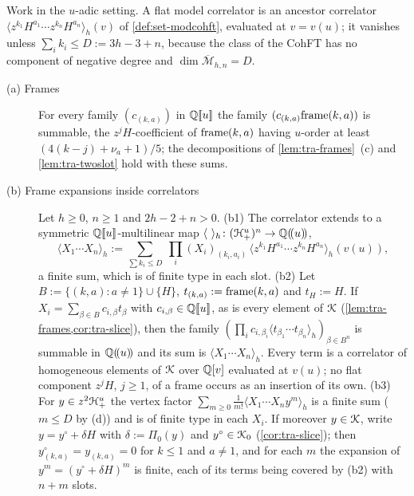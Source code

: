 
\begin{lem}
\label{lem:tra-conv}
Work in the $u$-adic setting. A flat model correlator is an ancestor correlator $\langle z^{k_1}H^{a_1}\cdots z^{k_n}H^{a_n}\rangle_h(v)$ of \cref{def:set-modcohft}, evaluated at $v = v(u)$; it vanishes unless $\sum_ik_i\leq D := 3h-3+n$, because the class of the CohFT has no component of negative degree and $\dim\overline{\mathcal M}_{h,n} = D$.
\begin{description}
\item[(a) Frames] For every family $(c_{(k,a)})$ in $\mathbb{Q}[\![ u ]\!]$ the family $(c_{(k,a)}\mathrm{frame}(k,a))$ is summable, the $z^jH$-coefficient of $\mathrm{frame}(k,a)$ having $u$-order at least $(4(k-j)+\nu_a+1)/5$; the decompositions of \cref{lem:tra-frames}~(c) and \cref{lem:tra-twoslot} hold with these sums.
\item[(b) Frame expansions inside correlators] Let $h\geq 0$, $n\geq 1$ and $2h-2+n>0$.
(b1) The correlator extends to a symmetric $\mathbb{Q}[\![ u ]\!]$-multilinear map $\langle\ \rangle_h\colon(\cH^u_+)^n\to\bbQ\lser{u}$,
\[
\langle X_1\cdots X_n\rangle_h := \sum_{\sum k_i\leq D}\ \prod_i(X_i)_{(k_i,a_i)}\,\langle z^{k_1}H^{a_1}\cdots z^{k_n}H^{a_n}\rangle_h(v(u)),
\]
a finite sum, which is of finite type in each slot.
(b2) Let $B := \{(k,a) : a\neq 1\}\cup\{H\}$, $t_{(k,a)} := \mathrm{frame}(k,a)$ and $t_H := H$. If $X_i = \sum_{\beta\in B}c_{i,\beta}t_\beta$ with $c_{i,\beta}\in\mathbb{Q}[\![ u ]\!]$, as is every element of $\mathcal{K}$ (\cref{lem:tra-frames,cor:tra-slice}), then the family $(\prod_ic_{i,\beta_i}\langle t_{\beta_1}\cdots t_{\beta_n}\rangle_h)_{\beta\in B^n}$ is summable in $\mathbb{Q}(\!(u)\!)$ and its sum is $\langle X_1\cdots X_n\rangle_h$. Every term is a correlator of homogeneous elements of $\mathcal{K}$ over $\mathbb{Q}[v]$ evaluated at $v(u)$; no flat component $z^jH$, $j\geq 1$, of a frame occurs as an insertion of its own.
(b3) For $y\in z^2\mathcal{H}^u_+$ the vertex factor $\sum_{m\geq 0}\frac1{m!}\langle X_1\cdots X_ny^m\rangle_h$ is a finite sum ($m\leq D$ by (d)) and is of finite type in each $X_i$. If moreover $y\in\mathcal{K}$, write $y = y^\circ+\delta H$ with $\delta := \Pi_0(y)$ and $y^\circ\in\mathcal{K}_{0}$ (\cref{cor:tra-slice}); then $y^\circ_{(k,a)} = y_{(k,a)} = 0$ for $k\leq 1$ and $a\neq 1$, and for each $m$ the expansion of $y^m = (y^\circ+\delta H)^m$ is finite, each of its terms being covered by (b2) with $n+m$ slots.

\end{description}
\end{lem}
